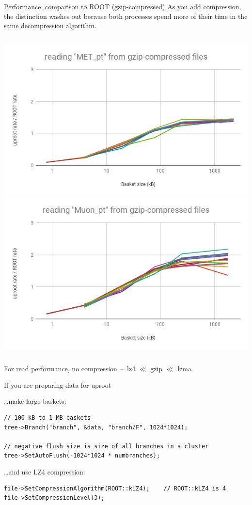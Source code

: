 \documentclass[aspectratio=169]{beamer}
\begin{document}
\begin{frame}{Performance: comparison to ROOT (gzip-compressed)}
\vspace{0.5 cm}
As you add compression, the distinction washes out because both processes spend more of their time in the same decompression algorithm.

\vspace{0.25 cm}
\begin{columns}
\includegraphics[width=0.5\linewidth]{root-gzip-met.png}
\includegraphics[width=0.5\linewidth]{root-gzip-muon.png}
\end{columns}

\vspace{0.25 cm}
For read performance, no compression $\sim$ lz4 $\ll$ gzip $\ll$ lzma.
\end{frame}

\begin{frame}[fragile]{If you are preparing data for uproot}
\vspace{0.5 cm}
\small

{\normalsize \ldots make large baskets:}

\begin{verbatim}
// 100 kB to 1 MB baskets
tree->Branch("branch", &data, "branch/F", 1024*1024);

// negative flush size is size of all branches in a cluster
tree->SetAutoFlush(-1024*1024 * numbranches);
\end{verbatim}

\vspace{0.75 cm}
{\normalsize \ldots and use LZ4 compression:}

\begin{verbatim}
file->SetCompressionAlgorithm(ROOT::kLZ4);    // ROOT::kLZ4 is 4
file->SetCompressionLevel(3);
\end{verbatim}
\end{frame}
\end{document}
